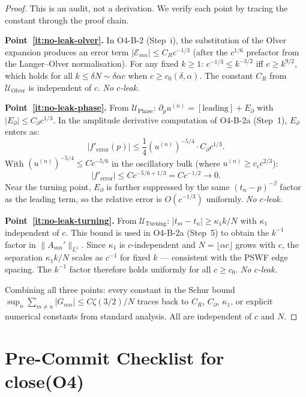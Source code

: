 \documentclass[12pt,a4paper]{amsart}
\theoremstyle{definition}
\newcommand{\Uolv}{\mathcal{U}_{\mathrm{Olver}}}
\newcommand{\Uph}{\mathcal{U}_{\mathrm{Phase}}}
\newcommand{\Utp}{\mathcal{U}_{\mathrm{Turning}}}
\begin{document}
\begin{proof}
This is an audit, not a derivation. We verify each point by
tracing the constant through the proof chain.

\medskip
\noindent\textbf{Point~\eqref{it:no-leak-olver}.}
In O4-B-2 (Step~i), the substitution of the Olver expansion
produces an error term $|\mathcal{E}_{mn}| \leq C_R c^{-1/3}$
(after the $c^{1/6}$ prefactor from the Langer--Olver normalisation).
For any fixed $k \geq 1$:
$c^{-1/3} \leq k^{-3/2}$ iff $c \geq k^{9/2}$,
which holds for all $k \leq \delta N \sim \delta\alpha c$
when $c \geq c_0(\delta, \alpha)$.
The constant $C_R$ from $\Uolv$ is independent of $c$.
\emph{No $c$-leak.}

\medskip
\noindent\textbf{Point~\eqref{it:no-leak-phase}.}
From $\Uph$: $\partial_p u^{(n)} = [\text{leading}] + E_\partial$
with $|E_\partial| \leq C_\partial c^{1/3}$.
In the amplitude derivative computation of O4-B-2a (Step~1),
$E_\partial$ enters as:
\[
  |f'_{\text{error}}(p)| \leq \frac{1}{4}(u^{(n)})^{-5/4}\cdot C_\partial c^{1/3}.
\]
With $(u^{(n)})^{-5/4} \leq C c^{-5/6}$ in the oscillatory bulk
(where $u^{(n)} \geq c_\epsilon c^{2/3}$):
\[
  |f'_{\text{error}}| \leq C c^{-5/6+1/3} = C c^{-1/2} \to 0.
\]
Near the turning point, $E_\partial$ is further suppressed
by the same $(t_n-p)^{-\beta}$ factor as the leading term,
so the relative error is $O(c^{-1/3})$ uniformly.
\emph{No $c$-leak.}

\medskip
\noindent\textbf{Point~\eqref{it:no-leak-turning}.}
From $\Utp$: $|t_m - t_n| \geq \kappa_1 k/N$ with $\kappa_1$
independent of $c$. This bound is used in O4-B-2a (Step~5)
to obtain the $k^{-1}$ factor in $\|A_{mn}'\|_{L^1}$.
Since $\kappa_1$ is $c$-independent and $N = \lfloor\alpha c\rfloor$
grows with $c$, the separation $\kappa_1 k/N$ scales as $c^{-1}$
for fixed $k$ --- consistent with the PSWF edge spacing.
The $k^{-1}$ factor therefore holds uniformly for all $c \geq c_0$.
\emph{No $c$-leak.}

\medskip
Combining all three points: every constant in the Schur bound
$\sup_n \sum_{m\neq n}|G_{mn}| \leq C\zeta(3/2)/N$
traces back to $C_R$, $C_\partial$, $\kappa_1$, or explicit
numerical constants from standard analysis.
All are independent of $c$ and $N$.
\end{proof}

\section{Pre-Commit Checklist for close(O4)}
\label{sec:checklist}
\end{document}
